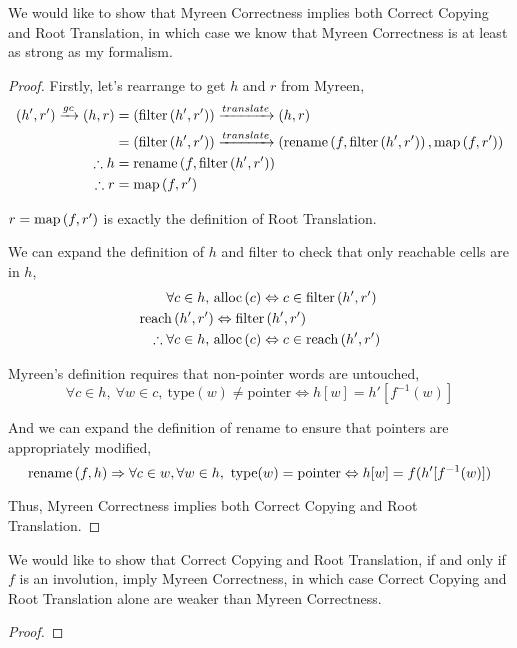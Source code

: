 \begin{theorem}
  We would like to show that Myreen Correctness implies both Correct
  Copying and Root Translation, in which case we know that Myreen
  Correctness is at least as strong as my formalism.

  \begin{proof}
    Firstly, let's rearrange to get $h$ and $r$ from Myreen,
    \begin{align*}
      (h', r') \xrightarrow{gc} (h, r) &= (\mathrm{filter}\left(h', r'\right)) \xrightarrow{translate} (h, r)\\
      &= (\mathrm{filter}\left(h', r'\right)) \xrightarrow{translate} (\mathrm{rename}\left(f, \mathrm{filter}\left(h', r'\right)\right), \mathrm{map}\left(f, r'\right))\\
      \therefore h &= \mathrm{rename}\left(f, \mathrm{filter}\left(h', r'\right)\right)\\
      \therefore r &= \mathrm{map}\left(f, r'\right)
    \end{align*}

    $r = \mathrm{map}\left(f, r'\right)$ is exactly the definition of Root Translation.

    We can expand the definition of $h$ and filter to check that only
    reachable cells are in $h$,
    \begin{align*}
      \forall c \in h,\ &\mathrm{alloc}\left(c\right) \Leftrightarrow c \in \mathrm{filter}\left(h', r'\right)\\
      \mathrm{reach}\left(h', r'\right) &\Leftrightarrow \mathrm{filter}\left(h', r'\right)\\
      \therefore \forall c \in h,\ &\mathrm{alloc}\left(c\right) \Leftrightarrow c \in \mathrm{reach}\left(h', r'\right)
    \end{align*}

    Myreen's definition requires that non-pointer words are
    untouched, \[\forall c \in h,\ \forall w \in c,\ \mathrm{type}(w)
    \neq \mathrm{pointer} \iff h[w] = h'[f^{-1}(w)]\]

    And we can expand the definition of rename to ensure that pointers
    are appropriately modified, \[\mathrm{rename}\left(f, h\right) \Rightarrow \forall c \in
    w, \forall w \in h,\ \mathrm{type}(w) = \mathrm{pointer} \Leftrightarrow h[w]
    = f(h'[f^{-1}(w)])\]

    Thus, Myreen Correctness implies both Correct Copying and Root
    Translation.
  \end{proof}
\end{theorem}

\begin{theorem}
  We would like to show that Correct Copying and Root Translation, if
  and only if $f$ is an involution, imply Myreen Correctness, in which
  case Correct Copying and Root Translation alone are weaker than
  Myreen Correctness.

  \begin{proof}
    
  \end{proof}
\end{theorem}

